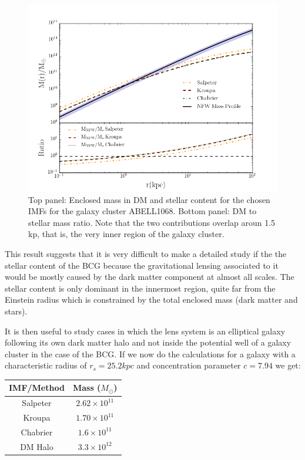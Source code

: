 \begin{figure}[H]
\centering
\includegraphics[width=12cm]{images/DM_fraction_all_IMFs.png}
\caption[Enclosed mass and DM to stellar mass ratio for a galaxy cluster]{Top panel: Enclosed mass in DM and stellar content for the chosen IMFs for the galaxy cluster ABELL1068. Bottom panel: DM to stellar mass ratio. Note that the two contributions overlap aroun 1.5 kp, that is, the very inner region of the galaxy cluster.}
\end{figure}

This result suggests that it is very difficult to make a detailed study if the the stellar content of the BCG because the gravitational lensing associated to it would be mostly caused by the dark matter component at almost all scales. The stellar content is only dominant in the innermost region, quite far from the Einstein radius which is constrained by the total enclosed mass (dark matter and stars).

It is then useful to study cases in which the lens system is an elliptical galaxy following its own dark matter halo and not inside the potential well of a galaxy cluster in the case of the BCG. If we now do the calculations for a galaxy with a characteristic radius of $r_s=25.2 kpc$ and concentration parameter $c=7.94$ we get:

\begin{center}
\begin{tabular}{c c}
IMF/Method & Mass ($M_{\odot}$)\tabularnewline
\hline 
\hline
Salpeter & $2.62\times10^{11}$\tabularnewline
Kroupa & $1.70\times10^{11}$\tabularnewline
Chabrier & $1.6\times10^{11}$\tabularnewline
DM Halo & $3.3\times10^{12}$\tabularnewline
\end{tabular}
\end{center}

